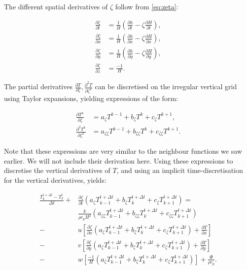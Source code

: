\documentclass{article}
\begin{document}
The different spatial derivatives of $\zeta$ follow from \eqref{eq:zeta}:

\begin{align}
\frac{\partial \zeta}{\partial t} &= \frac{1}{H} \left( \frac{\partial h}{\partial t} - \zeta \frac{\partial H}{\partial t} \right), \\
\frac{\partial \zeta}{\partial x} &= \frac{1}{H} \left( \frac{\partial h}{\partial x} - \zeta \frac{\partial H}{\partial x} \right), \\
\frac{\partial \zeta}{\partial y} &= \frac{1}{H} \left( \frac{\partial h}{\partial y} - \zeta \frac{\partial H}{\partial y} \right), \\
\frac{\partial \zeta}{\partial z} &= \frac{-1}{H}.
\end{align}

The partial derivatives $\frac{\partial T}{\partial \zeta}, \frac{\partial^2 T}{\partial \zeta^2}$ can be discretised on the irregular vertical grid using Taylor expansions, yielding expressions of the form:

\begin{align}
\frac{\partial T^k}{\partial \zeta} &= a_{\zeta} T^{k-1} + b_{\zeta} T^k + c_{\zeta} T^{k+1}, \\
\frac{\partial^2 T^k}{\partial \zeta^2} &= a_{\zeta \zeta} T^{k-1} + b_{\zeta \zeta} T^k + c_{\zeta \zeta} T^{k+1}.
\end{align}

Note that these expressions are very similar to the neighbour functions we saw earlier. We will not include their derivation here. Using these expressions to discretise the vertical derivatives of $T$, and using an implicit time-discretisation for the vertical derivatives, yields:

\begin{equation}
\begin{split}
\frac{T_k^{t + \Delta t} - T_k^t}{\Delta t} + & \frac{\partial \zeta}{\partial t} 
\left( a_{\zeta} T_{k-1}^{t+\Delta t} + b_{\zeta} T_k^{t+\Delta t} + c_{\zeta} T_{k+1}^{t+\Delta t} \right) = \\
& \frac{k}{\rho c_p H^2} \left( a_{\zeta \zeta} T_{k-1}^{t+\Delta t} + b_{\zeta \zeta} T_k^{t+\Delta t} + c_{\zeta \zeta} T_{k+1}^{t+\Delta t} \right) \\
- & u \left[ \frac{\partial \zeta}{\partial x} \left( a_{\zeta} T_{k-1}^{t+\Delta t} + b_{\zeta} T_k^{t+\Delta t} + c_{\zeta} T_{k+1}^{t+\Delta t} \right) + \frac{\partial T}{\partial x} \right] \\
- & v \left[ \frac{\partial \zeta}{\partial y} \left( a_{\zeta} T_{k-1}^{t+\Delta t} + b_{\zeta} T_k^{t+\Delta t} + c_{\zeta} T_{k+1}^{t+\Delta t} \right) + \frac{\partial T}{\partial y} \right] \\
- & w \left[ \frac{-1}{H} \left( a_{\zeta} T_{k-1}^{t+\Delta t} + b_{\zeta} T_k^{t+\Delta t} + c_{\zeta} T_{k+1}^{t+\Delta t} \right) \right]
+ \frac{\Phi}{\rho c_p}.
\end{split}
\end{equation}
\end{document}
